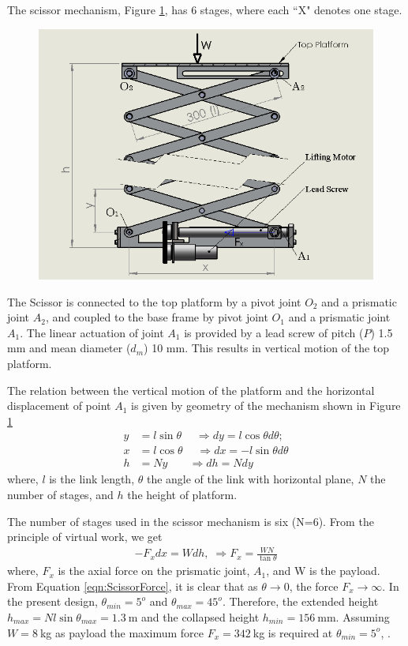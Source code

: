 The scissor mechanism, Figure \ref{fig:scissor}, has 6 stages, where each ``X" denotes one stage. 
\begin{figure}
	\centering
	\includegraphics[width=.8\linewidth,keepaspectratio]{Chapter3/fig/scissor}
	\label{fig:scissor}
\end{figure}
The Scissor is connected to the top platform by a pivot joint $O_2$ and a prismatic joint $ A_2$, and coupled to the base frame by pivot joint $O_1$ and a prismatic joint $A_1$. The linear actuation of joint $A_1$ is provided by a lead screw of pitch ($P$) 1.5 mm and mean diameter ($d_m$) 10 mm.  This results in vertical motion of the top platform. 
  
 The relation between the vertical motion of the platform and the horizontal displacement of point $A_1$ is given by geometry of the mechanism shown in Figure \ref{fig:scissor} 
\begin{equation}
\begin{aligned}
y&=l\sin\theta\;\quad \Rightarrow dy=l\cos\theta d\theta;\\
 x&=l\cos\theta \; \quad \Rightarrow dx=-l\sin\theta d\theta\\
h&=Ny~~~\; \quad\Rightarrow dh=Ndy
\end{aligned}
\end{equation} 
where, $l$ is the link length, $\theta$ the angle of the link with horizontal plane, $N$ the number of stages, and $h$ the height of platform.


The number of stages used in the scissor mechanism is six (N=6). From the principle of virtual work, we get 
\begin{equation}
\label{eqn:ScissorForce}
\begin{aligned}
-F_xdx=Wdh,\;\Rightarrow F_x=\frac{WN}{\tan\theta}
\end{aligned}
\end{equation}
where, $F_x$ is the axial force on the prismatic joint, $A_1$, and W is the payload. From Equation \ref{eqn:ScissorForce}, it is clear that as $\theta\rightarrow 0$, the force  $F_x \rightarrow \infty$. In the present design,  $\theta_{min}=5^o$ and $\theta_{max}=45^o$. Therefore, the extended height  $h_{max}=Nl\sin\theta_{max}=1.3~$m and the collapsed height $h_{min}=156~$mm. Assuming $W=8~$kg as payload the maximum force $F_x=342~$kg is required at $\theta_{min}=5^o$, . 

